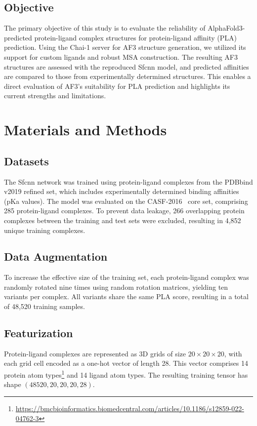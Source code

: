 \documentclass[unnumsec,webpdf,contemporary,large]{oup-authoring-template}
\theoremstyle{thmstyleone}%
\theoremstyle{thmstyletwo}%
\theoremstyle{thmstylethree}%
\begin{document}
\subsection{Objective}
The primary objective of this study is to evaluate the reliability of AlphaFold3-predicted protein-ligand complex structures for protein-ligand affinity (PLA) prediction. 
Using the Chai-1 server for AF3 structure generation, we utilized its support for custom ligands and robust MSA construction. 
The resulting AF3 structures are assessed with the reproduced Sfcnn model, and predicted affinities are compared to those from experimentally determined structures. 
This enables a direct evaluation of AF3's suitability for PLA prediction and highlights its current strengths and limitations.

\section{Materials and Methods}
\vspace{0.5em}
\subsection{Datasets}
The Sfcnn network was trained using protein-ligand complexes from the PDBbind v2019 refined set\cite{Wang2005PDBbind}, which includes experimentally determined binding affinities (pKa values). The model was evaluated on the CASF-2016~\cite{su2018comparative} core set, comprising 285 protein-ligand complexes. To prevent data leakage, 266 overlapping protein complexes between the training and test sets were excluded, resulting in 4,852 unique training complexes.

\subsection{Data Augmentation}
To increase the effective size of the training set, each protein-ligand complex was randomly rotated nine times using random rotation matrices, yielding ten variants per complex. All variants share the same PLA score, resulting in a total of 48,520 training samples.

\subsection{Featurization}
Protein-ligand complexes are represented as 3D grids of size $20 \times 20 \times 20$, with each grid cell encoded as a one-hot vector of length 28. This vector comprises 14 protein atom types\footnote{\url{https://bmcbioinformatics.biomedcentral.com/articles/10.1186/s12859-022-04762-3}} and 14 ligand atom types. The resulting training tensor has shape $(48520, 20, 20, 20, 28)$.
\end{document}

